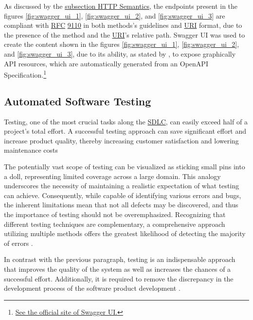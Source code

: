 As discussed by the \hyperref[subsection:http_semantics]{subsection HTTP Semantics}, the endpoints present in the figures \ref{fig:swagger_ui_1}, 
\ref{fig:swagger_ui_2}, and \ref{fig:swagger_ui_3} are compliant with \hyperref[appendix:glossary]{RFC} \href{https://www.rfc-editor.org/rfc/rfc9110.html}{9110} in both methods's guidelines and \hyperref[appendix:glossary]{URI} format, due to the presence of the method and the \hyperref[appendix:glossary]{URI}'s relative path. Swagger UI was used to create the content shown in the figures \ref{fig:swagger_ui_1}, \ref{fig:swagger_ui_2}, and \ref{fig:swagger_ui_3}, due to its ability, as stated by \cite{mcnamara2022flexible}, to expose graphically API resources, which are automatically generated from an OpenAPI Specification.\footnote{\href{https://swagger.io/tools/swagger-ui/}{See the official site of Swagger UI.}}

\subsection{Automated Software Testing}
\label{subsection:automated_software_testing}

Testing, one of the most crucial tasks along the \hyperref[appendix:glossary]{SDLC}, can easily exceed half of a project’s total effort. A successful testing approach can save significant effort and increase product quality, thereby increasing customer satisfaction and lowering maintenance costs \cite{juristo2006guest, tuteja2012research}

The potentially vast scope of testing can be visualized as sticking small pins into a doll, representing limited coverage across a large domain. This analogy underscores the necessity of maintaining a realistic expectation of 
what testing can achieve. Consequently, while capable of identifying various errors and bugs, the inherent limitations mean that not all defects may be discovered, and thus the importance of testing should not be overemphasized. 
Recognizing that different testing techniques are complementary, a comprehensive approach utilizing multiple methods offers the greatest likelihood of detecting the majority of errors 
\cite{meyer2008seven, pocatilu2002automated, sethi2017review, yadav2019software}.

In contrast with the previous paragraph, testing is an indispensable approach that improves the quality of the system as well as increases the chances of a successful effort. Additionally, it is required to remove the discrepancy in the development process of the software product development \cite{jindal2016importance}.

